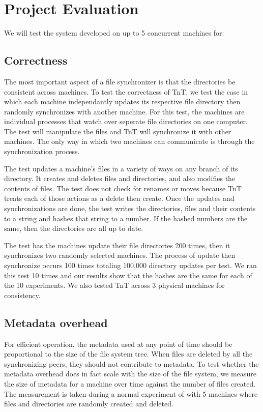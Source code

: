 \section{Project Evaluation}

We will test the system developed on up to 5 concurrent machines for:

\subsection{\bf Correctness} The most important aspect of a file synchronizer is that the directories be consistent across machines.  To test the correctness of TnT, we test the case in which each machine independantly updates its respective file directory then randomly synchronizes with another machine.  For this test, the machines are individual processes that watch over seperate file directories on one computer.  The test will manipulate the files and TnT will synchronize it with other machines.  The only way in which two machines can communicate is through the synchronization process.

The test updates a machine's files in a variety of ways on any branch of its directory.  It creates and deletes files and directories, and also modifies the contents of files.  The test does not check for renames or moves because TnT treats each of those actions as a delete then create.  Once the updates and synchronizations are done, the test writes the directories, files and their contents to a string and hashes that string to a number.  If the hashed numbers are the same, then the directories are all up to date.

The test has the machines update their file directories 200 times, then it synchronizes two randomly selected machines.  The process of update then synchronize occurs 100 times totaling 100,000 directory updates per test.  We ran this test 10 times and our results show that the hashes are the same for each of the 10 experiments.  We also tested TnT across 3 physical machines for consistency.

\subsection{\bf Metadata overhead} For efficient operation, the metadata used at any point of time should be proportional to the size of the file system tree. When files are deleted by all the synchronizing peers, they should not contribute to metadata.  To test whether the metadata overhead does in fact scale with the size of the file system, we measure the size of metadata for a machine over time against the number of files created.  The measurement is taken during a normal experiment of with 5 machines where files and directories are randomly created and deleted.  

